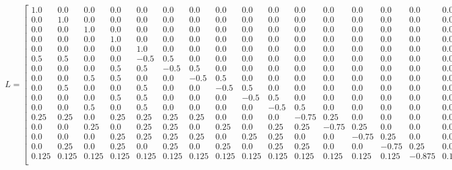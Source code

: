 \documentclass[11pt]{article}
\begin{document}
$$L=
\left[\begin{smallmatrix}
    1.0 & 0.0 & 0.0 & 0.0 & 0.0 & 0.0 & 0.0 & 0.0 & 0.0 & 0.0 & 0.0 & 0.0 & 0.0 & 0.0 & 0.0 & 0.0 \\
    0.0 & 1.0 & 0.0 & 0.0 & 0.0 & 0.0 & 0.0 & 0.0 & 0.0 & 0.0 & 0.0 & 0.0 & 0.0 & 0.0 & 0.0 & 0.0 \\
    0.0 & 0.0 & 1.0 & 0.0 & 0.0 & 0.0 & 0.0 & 0.0 & 0.0 & 0.0 & 0.0 & 0.0 & 0.0 & 0.0 & 0.0 & 0.0 \\
    0.0 & 0.0 & 0.0 & 1.0 & 0.0 & 0.0 & 0.0 & 0.0 & 0.0 & 0.0 & 0.0 & 0.0 & 0.0 & 0.0 & 0.0 & 0.0 \\
    0.0 & 0.0 & 0.0 & 0.0 & 1.0 & 0.0 & 0.0 & 0.0 & 0.0 & 0.0 & 0.0 & 0.0 & 0.0 & 0.0 & 0.0 & 0.0 \\
    0.5 & 0.5 & 0.0 & 0.0 & -0.5 & 0.5 & 0.0 & 0.0 & 0.0 & 0.0 & 0.0 & 0.0 & 0.0 & 0.0 & 0.0 & 0.0 \\
    0.0 & 0.0 & 0.0 & 0.5 & 0.5 & -0.5 & 0.5 & 0.0 & 0.0 & 0.0 & 0.0 & 0.0 & 0.0 & 0.0 & 0.0 & 0.0 \\
    0.0 & 0.0 & 0.5 & 0.5 & 0.0 & 0.0 & -0.5 & 0.5 & 0.0 & 0.0 & 0.0 & 0.0 & 0.0 & 0.0 & 0.0 & 0.0 \\
    0.0 & 0.5 & 0.0 & 0.0 & 0.5 & 0.0 & 0.0 & -0.5 & 0.5 & 0.0 & 0.0 & 0.0 & 0.0 & 0.0 & 0.0 & 0.0 \\
    0.0 & 0.0 & 0.0 & 0.5 & 0.5 & 0.0 & 0.0 & 0.0 & -0.5 & 0.5 & 0.0 & 0.0 & 0.0 & 0.0 & 0.0 & 0.0 \\
    0.0 & 0.0 & 0.5 & 0.0 & 0.5 & 0.0 & 0.0 & 0.0 & 0.0 & -0.5 & 0.5 & 0.0 & 0.0 & 0.0 & 0.0 & 0.0 \\
    0.25 & 0.25 & 0.0 & 0.25 & 0.25 & 0.25 & 0.25 & 0.0 & 0.0 & 0.0 & -0.75 & 0.25 & 0.0 & 0.0 & 0.0 & 0.0 \\
    0.0 & 0.0 & 0.25 & 0.0 & 0.25 & 0.25 & 0.0 & 0.25 & 0.0 & 0.25 & 0.25 & -0.75 & 0.25 & 0.0 & 0.0 & 0.0 \\
    0.0 & 0.0 & 0.0 & 0.25 & 0.25 & 0.25 & 0.25 & 0.0 & 0.25 & 0.25 & 0.0 & 0.0 & -0.75 & 0.25 & 0.0 & 0.0 \\
    0.0 & 0.25 & 0.0 & 0.25 & 0.0 & 0.25 & 0.0 & 0.25 & 0.0 & 0.25 & 0.25 & 0.0 & 0.0 & -0.75 & 0.25 & 0.0 \\
    0.125 & 0.125 & 0.125 & 0.125 & 0.125 & 0.125 & 0.125 & 0.125 & 0.125 & 0.125 & 0.125 & 0.125 & 0.125 & 0.125 & -0.875 & 0.125\\
\end{smallmatrix}\right].
$$

\end{document}
